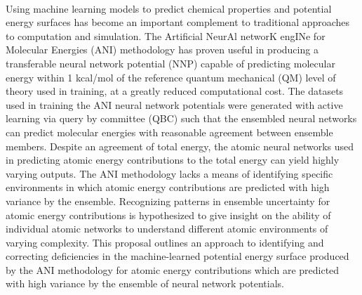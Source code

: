 \\
Using machine learning models to predict chemical properties and potential energy surfaces has become an important complement to traditional approaches to computation and simulation. The Artificial NeurAl networK engINe for Molecular Energies (ANI) methodology has proven useful in producing a transferable neural network potential (NNP) capable of predicting molecular energy within 1 kcal/mol of the reference quantum mechanical (QM) level of theory used in training, at a greatly reduced computational cost. The datasets used in training the ANI neural network potentials were generated with active learning via query by committee (QBC) such that the ensembled neural networks can predict molecular energies with reasonable agreement between ensemble members. Despite an agreement of total energy, the atomic neural networks used in predicting atomic energy contributions to the total energy can yield highly varying outputs. The ANI methodology lacks a means of identifying specific environments in which atomic energy contributions are predicted with high variance by the ensemble. Recognizing patterns in ensemble uncertainty for atomic energy contributions is hypothesized to give insight on the ability of individual atomic networks to understand different atomic environments of varying complexity. This proposal outlines an approach to identifying and correcting deficiencies in the machine-learned potential energy surface produced by the ANI methodology for atomic energy contributions which are predicted with high variance by the ensemble of neural network potentials. 
